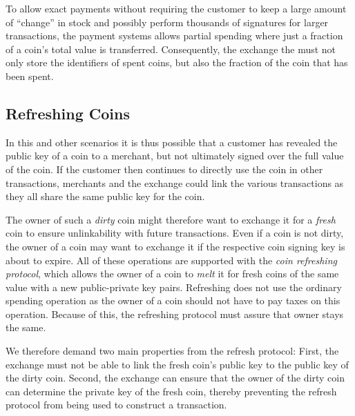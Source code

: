 \documentclass{llncs}
\begin{document}
To allow exact payments without requiring the customer to keep a large
amount of ``change'' in stock and possibly perform thousands of
signatures for larger transactions, the payment systems allows partial
spending where just a fraction of a coin's total value is transferred.
Consequently, the exchange the must not only store the identifiers of
spent coins, but also the fraction of the coin that has been spent.


\subsection{Refreshing Coins}

In this and other scenarios it is thus possible that a customer has
revealed the public key of a coin to a merchant, but not ultimately
signed over the full value of the coin.  If the customer then
continues to directly use the coin in other transactions, merchants
and the exchange could link the various transactions as they all share the
same public key for the coin.

The owner of such a {\em dirty} coin might therefore want to exchange it
for a {\em fresh} coin to ensure unlinkability with future transactions.
Even if a coin is not dirty, the owner of a coin may want to exchange it
if the respective coin signing key is about to expire.  All of these
operations are supported with the {\em coin refreshing protocol}, which
allows the owner of a coin to {\em melt} it for fresh coins of the same
value with a new public-private key pairs.  Refreshing does not use the
ordinary spending operation as the owner of a coin should not have to
pay taxes on this operation.  Because of this, the refreshing protocol
must assure that owner stays the same.

We therefore demand two main properties from the refresh protocol:
First, the exchange must not be able to link the fresh coin's public key to
the public key of the dirty coin.  Second, the exchange can ensure that the
owner of the dirty coin can determine the private key of the
fresh coin, thereby preventing the refresh protocol from being used to
construct a transaction.

%
\end{document}

